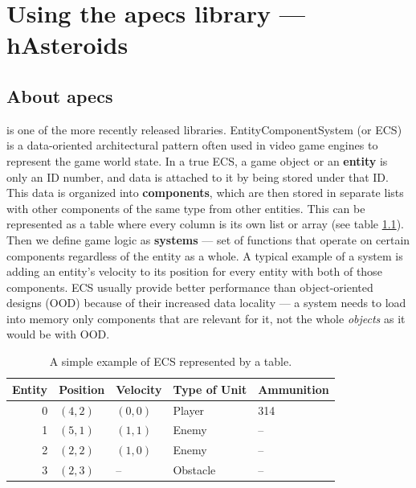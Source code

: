 \documentclass[
  digital, %
  color,   %
  table,   %
  oneside, %
  lof,     %
  lot,     %
]{fithesis3}
\begin{document}
\chapter{Using the apecs library --- hAsteroids}
\label{chptr:hasteroids}

\section{About apecs}
\label{sect:apecs}
\cite{apecsrepo}
is one of the more recently released libraries.
Entity\textendash{}Component\textendash{}System (or ECS) is a data-oriented architectural pattern often
used in video game engines to represent the game world state.
In a true ECS, a game object or an \textbf{entity} is only an ID number,
and data is attached to it by being stored under that ID. This data is
organized into \textbf{components}, which are then stored in separate
lists with other components of the same type from other entities.\cite{mediumecs} This can
be represented as a table where every column is its own list or array
(see table \ref{tab:ecsexamp}). Then we define game logic as \textbf{systems}
--- set of functions that operate on certain components regardless of the
entity as a whole. A typical example of a system is adding an entity's velocity
to its position for every entity with both of those components.
ECS usually provide better performance than object-oriented designs (OOD)
because of their increased data locality --- a system needs to load into memory
only components that are relevant for it, not the whole \emph{objects}
as it would be with OOD.\cite{apecspaper}
\begin{table}[htp]
  \begin{tabularx}{320pt}{|r|lllX|}
    \toprule
    Entity & Position & Velocity & Type of Unit & Ammunition \\
    \midrule
    0 & $(4,2)$ & $(0,0)$ & Player   & 314\\
    1 & $(5,1)$ & $(1,1)$ & Enemy    & -- \\
    2 & $(2,2)$ & $(1,0)$ & Enemy    & -- \\
    3 & $(2,3)$ & --      & Obstacle & -- \\
    \bottomrule
  \end{tabularx}
  \caption{A simple example of ECS represented by a table.}
  \label{tab:ecsexamp}
\end{table}
\end{document}
